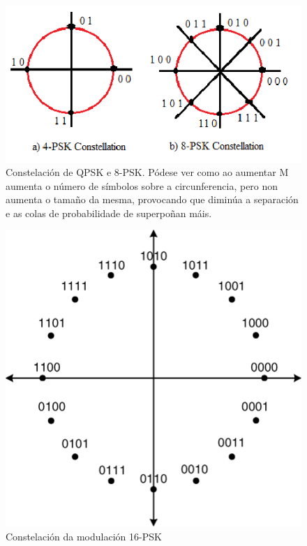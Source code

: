 \documentclass[
	10pt, %
	spanish, %
]{fphw}
\begin{document}
\begin{figure}[htb]
\centering
\includegraphics{4_8_psk_const.png}
\caption{Constelación de QPSK e 8-PSK. Pódese ver como ao aumentar M aumenta o número de símbolos sobre a circunferencia, pero non aumenta o tamaño da mesma, provocando que diminúa a separación e as colas de probabilidade de superpoñan máis.}
\end{figure}
\begin{figure}[htb]
\centering
\includegraphics[scale=0.5]{psk_16_const.png}
\caption{Constelación da modulación 16-PSK}
\end{figure}
\end{document}
